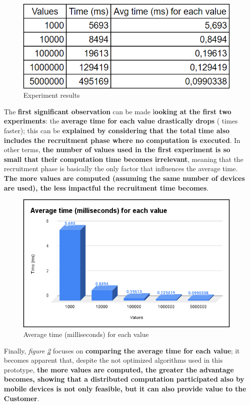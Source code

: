 \begin{figure}[!ht]
    \centering
    \includegraphics[scale=0.55]{document/chapters/chapter_7/images/experiment_results.png}
    \caption{Experiment results}
    \label{fig:experiment_results}
\end{figure}

The \textbf{first significant observation} can be made l\textbf{ooking at the first two experiments}: the \textbf{average time for each value drastically drops} ( times faster); this can be \textbf{explained by considering that the total time also includes the recruitment phase where no computation is executed}. In other terms, \textbf{the number of values used in the first experiment is so small that their computation time becomes irrelevant}, meaning that the recruitment phase is basically the only factor that influences the average time. \textbf{The more values are computed (assuming the same number of devices are used), the less impactful the recruitment time becomes}.

\begin{figure}[!ht]
    \centering
    \includegraphics[scale=0.55]{document/chapters/chapter_7/images/experiment_results_avg_ms_per_value.png}
    \caption{Average time (milliseconds) for each value}
    \label{fig:experiment_results_avg_ms_per_value}
\end{figure}

Finally, \textit{figure \ref{fig:experiment_results_avg_ms_per_value}} focuses on \textbf{comparing the average time for each value}; it becomes apparent that, despite the not optimized algorithms used in this prototype, \textbf{the more values are computed, the greater the advantage becomes, showing that a distributed computation participated also by mobile devices is not only feasible, but it can also provide value to the Customer}.
